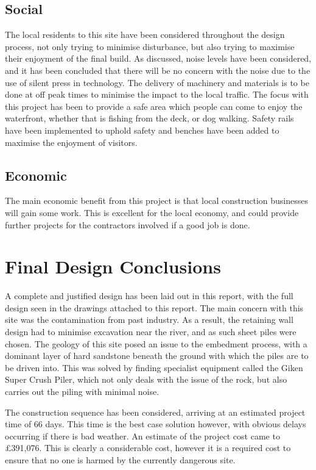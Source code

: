 \documentclass[12pt, a4paper]{article}
\begin{document}
\subsection{Social}
The local residents to this site have been considered throughout the design process, not only trying to minimise disturbance, but also trying to maximise their enjoyment of the final build. As discussed, noise levels have been considered, and it has been concluded that there will be no concern with the noise due to the use of silent press in technology. The delivery of machinery and materials is to be done at off peak times to minimise the impact to the local traffic. The focus with this project has been to provide a safe area which people can come to enjoy the waterfront, whether that is fishing from the deck, or dog walking. Safety rails have been implemented to uphold safety and benches have been added to maximise the enjoyment of visitors. 
\subsection{Economic}
\begin{justify}
The main economic benefit from this project is that local construction businesses will gain some work. This is excellent for the local economy, and could provide further projects for the contractors involved if a good job is done.
\end{justify}
\section{Final Design Conclusions}
\begin{justify}
A complete and justified design has been laid out in this report, with the full design seen in the drawings attached to this report. The main concern with this site was the contamination from past industry. As a result, the retaining wall design had to minimise excavation near the river, and as such sheet piles were chosen. The geology of this site posed an issue to the embedment process, with a dominant layer of hard sandstone beneath the ground with which the piles are to be driven into. This was solved by finding specialist equipment called the Giken Super Crush Piler, which not only deals with the issue of the rock, but also carries out the piling with minimal noise. 
\end{justify}
\begin{justify}
The construction sequence has been considered, arriving at an estimated project time of 66 days. This time is the best case solution however, with obvious delays occurring if there is bad weather. An estimate of the project cost came to £391,076. This is clearly a considerable cost, however it is a required cost to ensure that no one is harmed by the currently dangerous site.
\end{justify}
\end{document}
